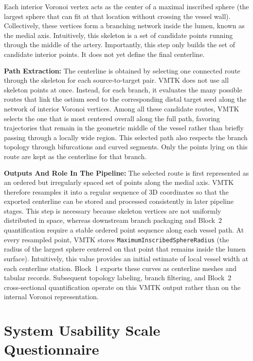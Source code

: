 Each interior Voronoi vertex acts as the center of a maximal inscribed sphere (the largest sphere that can fit at that location without crossing the vessel wall). Collectively, these vertices form a branching network inside the lumen, known as the medial axis. Intuitively, this skeleton is a set of candidate points running through the middle of the artery. Importantly, this step only builds the set of candidate interior points. It does not yet define the final centerline.

\noindent\textbf{Path Extraction:} The centerline is obtained by selecting one connected route through the skeleton for each source-to-target pair. VMTK does not use all skeleton points at once. Instead, for each branch, it evaluates the many possible routes that link the ostium seed to the corresponding distal target seed along the network of interior Voronoi vertices. Among all these candidate routes, VMTK selects the one that is most centered overall along the full path, favoring trajectories that remain in the geometric middle of the vessel rather than briefly passing through a locally wide region. This selected path also respects the branch topology through bifurcations and curved segments. Only the points lying on this route are kept as the centerline for that branch.

\noindent\textbf{Outputs And Role In The Pipeline:} The selected route is first represented as an ordered but irregularly spaced set of points along the medial axis. VMTK therefore resamples it into a regular sequence of 3D coordinates so that the exported centerline can be stored and processed consistently in later pipeline stages. This step is necessary because skeleton vertices are not uniformly distributed in space, whereas downstream branch packaging and Block~2 quantification require a stable ordered point sequence along each vessel path. At every resampled point, VMTK stores \texttt{MaximumInscribedSphereRadius} (the radius of the largest sphere centered on that point that remains inside the lumen surface). Intuitively, this value provides an initial estimate of local vessel width at each centerline station. Block~1 exports these curves as centerline meshes and tabular records. Subsequent topology labeling, branch filtering, and Block~2 cross-sectional quantification operate on this VMTK output rather than on the internal Voronoi representation.

\clearpage
\section{System Usability Scale Questionnaire}
\label{app:sus-questionnaire}


